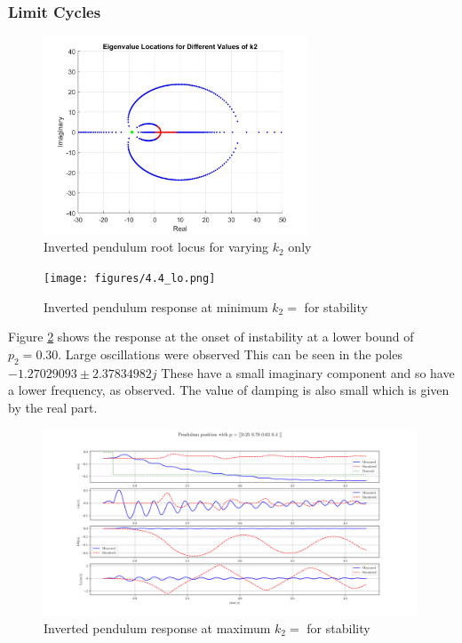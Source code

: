 \documentclass{article}
\begin{document}
\subsubsection{Limit Cycles}

\begin{figure}[H]
  \centering
  \includegraphics[width=0.7\textwidth]{figures/4.4roots.jpg}
  \caption{Inverted pendulum root locus for varying $k_2$ only}
  \label{fig:roots4.4}
\end{figure}

\begin{figure}[H]
  \centering
  \texttt{[image: figures/4.4\_lo.png]}
  \caption{Inverted pendulum response at minimum $k_2 = $ for stability}
  \label{fig:roots4.4_lo}
\end{figure}

Figure \ref{fig:roots4.4_lo} shows the response at the onset of instability at a lower bound of $p_2 = 0.30$.
Large oscillations were observed 
This can be seen in the poles $-1.27029093 \pm 2.37834982j$
These have a small imaginary component and so have a lower frequency, as observed.
The value of damping is also small which is given by the real part.

\begin{figure}[H]
  \centering
  \includegraphics[width=0.99\textwidth]{figures/4.4_hi.png}
  \caption{Inverted pendulum response at maximum $k_2 = $ for stability}
  \label{fig:roots4.4_hi}
\end{figure}
\end{document}
